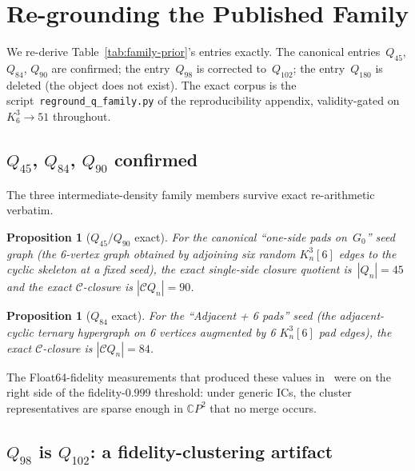 \documentclass[12pt,a4paper]{article}
\newtheorem{proposition}[theorem]{Proposition}
\theoremstyle{definition}
\theoremstyle{remark}
\newcommand{\bC}{\mathbb{C}}
\newcommand{\Kn}{K_n^3}
\newcommand{\Qn}{Q_n}
\newcommand{\Ccls}{\mathcal{C}}             %
\begin{document}
\section{Re-grounding the Published Family}\label{sec:regrounding}

We re-derive Table~\ref{tab:family-prior}'s entries exactly. The
canonical entries~$Q_{45}$, $Q_{84}$, $Q_{90}$ are confirmed; the
entry~$Q_{98}$ is corrected to~$Q_{102}$; the entry~$Q_{180}$ is
deleted (the object does not exist). The exact corpus is the
script~\texttt{reground\_q\_family.py} of the reproducibility
appendix, validity-gated on $K_6^3 \to 51$ throughout.

\subsection{$Q_{45}$, $Q_{84}$, $Q_{90}$ confirmed}
\label{sec:reground-confirmed}

The three intermediate-density family members survive exact
re-arithmetic verbatim.

\begin{proposition}[$Q_{45}/Q_{90}$ exact]\label{prop:Q90-exact}
For the canonical ``one-side pads on~$G_0$'' seed graph (the
6-vertex graph obtained by adjoining six random $\Kn[6]$ edges to
the cyclic skeleton at a fixed seed), the exact single-side
closure quotient is~$|\Qn| = 45$ and the exact $\Ccls$-closure is
$|\Ccls\Qn| = 90$.
\end{proposition}

\begin{proposition}[$Q_{84}$ exact]\label{prop:Q84-exact}
For the ``Adjacent + 6 pads'' seed (the adjacent-cyclic ternary
hypergraph on 6 vertices augmented by 6 $\Kn[6]$ pad edges), the
exact $\Ccls$-closure is $|\Ccls\Qn| = 84$.
\end{proposition}

The Float64-fidelity measurements that produced these values
in~\cite{CFSpipeline2026} were on the right side of the
fidelity-$0.999$ threshold: under generic ICs, the cluster
representatives are sparse enough in $\bC P^2$ that no merge occurs.





\subsection{$Q_{98}$ is $Q_{102}$: a fidelity-clustering artifact}
\label{sec:reground-Q102}
\end{document}
